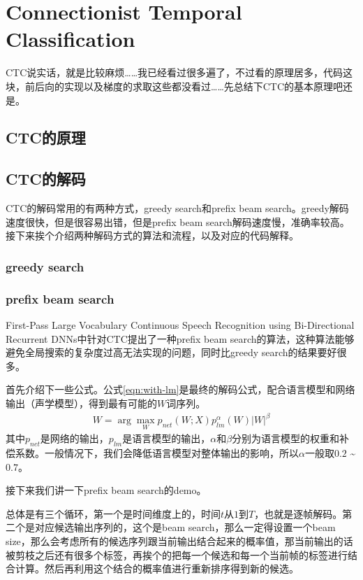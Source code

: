 \chapter{Connectionist Temporal Classification}

CTC说实话，就是比较麻烦……我已经看过很多遍了，不过看的原理居多，代码这块，前后向的实现以及梯度的求取这些都没看过……先总结下CTC的基本原理吧还是。
\section{CTC的原理}

\section{CTC的解码}
CTC的解码常用的有两种方式，greedy search和prefix beam search。greedy解码速度很快，但是很容易出错，但是prefix beam search解码速度慢，准确率较高。接下来挨个介绍两种解码方式的算法和流程，以及对应的代码解释。

\subsection{greedy search}


\subsection{prefix beam search}
First-Pass Large Vocabulary Continuous Speech Recognition using Bi-Directional Recurrent DNNs中针对CTC提出了一种prefix beam search的算法，这种算法能够避免全局搜索的复杂度过高无法实现的问题，同时比greedy search的结果要好很多。

首先介绍下一些公式。公式\ref{eqn:with-lm}是最终的解码公式，配合语言模型和网络输出（声学模型），得到最有可能的$W$词序列。
\begin{align}
\label{eqn:with-lm}
W = \arg\mathop{\max}_{W}p_{net}(W;X)p_{lm}^{\alpha}(W)|W|^{\beta}
\end{align}
其中$p_{net}$是网络的输出，$p_{lm}$是语言模型的输出，$\alpha$和$\beta$分别为语言模型的权重和补偿系数。一般情况下，我们会降低语言模型对整体输出的影响，所以$\alpha$一般取$0.2$ \~ $0.7$。


接下来我们讲一下prefix beam search的demo。

总体是有三个循环，第一个是时间维度上的，时间$t$从$1$到$T$，也就是逐帧解码。第二个是对应候选输出序列的，这个是beam search，那么一定得设置一个beam size，那么会考虑所有的候选序列跟当前输出结合起来的概率值，那当前输出的话被剪枝之后还有很多个标签，再挨个的把每一个候选和每一个当前帧的标签进行结合计算。然后再利用这个结合的概率值进行重新排序得到新的候选。


